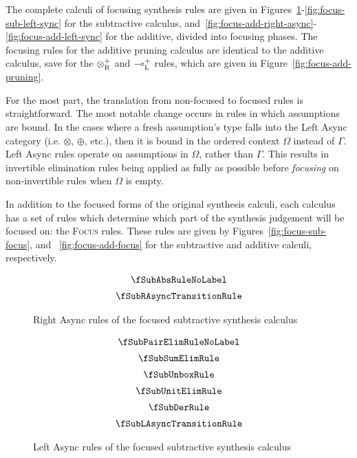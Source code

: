 The complete calculi of focusing synthesis rules are given in
Figures~\ref{fig:focus-sub-right-async}-\ref{fig:focus-sub-left-sync} for the
subtractive calculus,
and~\ref{fig:focus-add-right-async}-\ref{fig:focus-add-left-sync} for the
additive, divided into focusing phases. The focusing rules for the additive pruning 
calculus are identical to the additive calculus, save for the $\otimes^{+}_{\textsc{R}}$ and 
$\multimap^{+}_{\textsc{L}}$ rules, which are given in Figure~\ref{fig:focus-add-pruning}.

For the most part, the translation from
non-focused to focused rules is straightforward. The most notable change occurs
in rules in which assumptions are bound. In the cases where a fresh assumption's
type falls into the Left Async category (i.e. $\otimes$, $\oplus$, etc.), then it is bound in the
ordered context $\Omega$ instead of $\Gamma$. Left Async rules 
operate on assumptions in $\Omega$, rather than $\Gamma$. This results in invertible elimination rules
being applied as fully as possible before \textit{focusing} on non-invertible
rules when $\Omega$ is empty.

In addition to the focused forms of the original synthesis calculi, each
calculus has a set of rules which determine which part of the synthesis
judgement will be focused on: the \textsc{Focus} rules. These rules are given by
Figures~\ref{fig:focus-sub-focus}, and ~\ref{fig:focus-add-focus} for the
subtractive and additive calculi, respectively.


\begin{figure}[H]
  \begin{align*}
\begin{array}{c}
  \fSubAbsRuleNoLabel
  \\[0.5em]
  \fSubRAsyncTransitionRule
  \end{array}
  \end{align*}
  \caption{Right Async rules of the focused subtractive synthesis calculus}
  \label{fig:focus-sub-right-async}
\end{figure}

\begin{figure}[H]
  \begin{align*}
\begin{array}{c}
  \fSubPairElimRuleNoLabel
  \\[0.5em]
  \fSubSumElimRule
  \\[0.5em]
  \fSubUnboxRule
  \\[0.5em]
  \fSubUnitElimRule
  \\[0.5em]
  \fSubDerRule
  \\[0.5em]
  \fSubLAsyncTransitionRule
  \end{array}
  \end{align*}
  \caption{Left Async rules of the focused subtractive synthesis calculus}
  \label{fig:focus-sub-left-async}
\end{figure}

